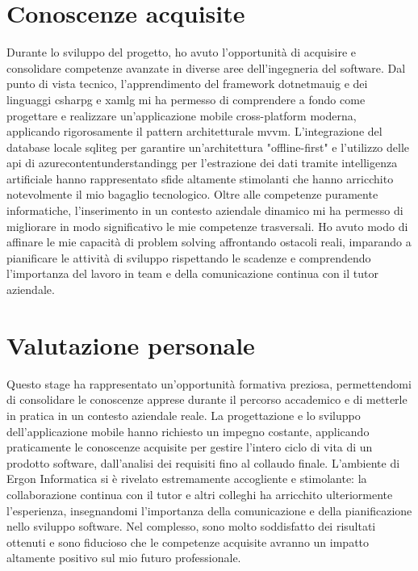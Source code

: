 \section{Conoscenze acquisite}
\noindent Durante lo sviluppo del progetto, ho avuto l'opportunità di acquisire e consolidare competenze avanzate in diverse aree dell'ingegneria del software. Dal punto di vista tecnico, l'apprendimento del framework \gls{dotnetmauig} e dei linguaggi \gls{csharpg} e \gls{xamlg} mi ha permesso di comprendere a fondo come progettare e realizzare un'applicazione mobile cross-platform moderna, applicando rigorosamente il pattern architetturale \gls{mvvm}. L'integrazione del database locale \gls{sqliteg} per garantire un'architettura "offline-first" e l'utilizzo delle \gls{api} di \gls{azurecontentunderstandingg} per l'estrazione dei dati tramite intelligenza artificiale hanno rappresentato sfide altamente stimolanti che hanno arricchito notevolmente il mio bagaglio tecnologico.
Oltre alle competenze puramente informatiche, l'inserimento in un contesto aziendale dinamico mi ha permesso di migliorare in modo significativo le mie competenze trasversali. Ho avuto modo di affinare le mie capacità di problem solving affrontando ostacoli reali, imparando a pianificare le attività di sviluppo rispettando le scadenze e comprendendo l'importanza del lavoro in team e della comunicazione continua con il tutor aziendale.


\section{Valutazione personale}
\noindent Questo stage ha rappresentato un'opportunità formativa preziosa, permettendomi di consolidare le conoscenze apprese durante il percorso accademico e di metterle in pratica in un contesto aziendale reale. La progettazione e lo sviluppo dell'applicazione mobile hanno richiesto un impegno costante, applicando praticamente le conoscenze acquisite per gestire l'intero ciclo di vita di un prodotto software, dall'analisi dei requisiti fino al collaudo finale. L'ambiente di Ergon Informatica si è rivelato estremamente accogliente e stimolante: la collaborazione continua con il tutor e altri colleghi ha arricchito ulteriormente l'esperienza, insegnandomi l'importanza della comunicazione e della pianificazione nello sviluppo software. Nel complesso, sono molto soddisfatto dei risultati ottenuti e sono fiducioso che le competenze acquisite avranno un impatto altamente positivo sul mio futuro professionale.


\newpage